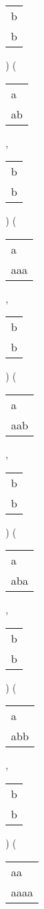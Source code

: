 \begin{description}
\begin{tabular}{|l|}
b \\
b \\
\hline
\end{tabular} 
) 
 ( 
\begin{tabular}{|l|} \hline
a\  \\
ab \\
\hline
\end{tabular} 
 , 
\begin{tabular}{|l|} \hline
b \\
b \\
\hline
\end{tabular} 
) 
 ( 
\begin{tabular}{|l|} \hline
a\ \  \\
aaa \\
\hline
\end{tabular} 
 , 
\begin{tabular}{|l|} \hline
b \\
b \\
\hline
\end{tabular} 
) 
 ( 
\begin{tabular}{|l|} \hline
a\ \  \\
aab \\
\hline
\end{tabular} 
 , 
\begin{tabular}{|l|} \hline
b \\
b \\
\hline
\end{tabular} 
) 
 ( 
\begin{tabular}{|l|} \hline
a\ \  \\
aba \\
\hline
\end{tabular} 
 , 
\begin{tabular}{|l|} \hline
b \\
b \\
\hline
\end{tabular} 
) 
 ( 
\begin{tabular}{|l|} \hline
a\ \  \\
abb \\
\hline
\end{tabular} 
 , 
\begin{tabular}{|l|} \hline
b \\
b \\
\hline
\end{tabular} 
) 
 ( 
\begin{tabular}{|l|} \hline
aa\ \  \\
aaaa \\

\end{tabular}
\end{description}
